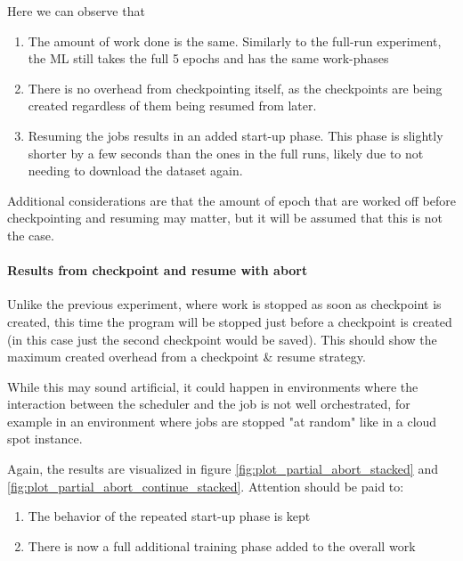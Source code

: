 Here we can observe that

\begin{enumerate}
    \item The amount of work done is the same. 
    Similarly to the full-run experiment, the ML still takes the full 5 epochs and has the same work-phases
    \item There is no overhead from checkpointing itself, as the checkpoints are being created regardless of them being resumed from later.
    \item Resuming the jobs results in an added start-up phase. This phase is slightly shorter by a few seconds than the ones in the full runs, likely due to not needing to download the dataset again.
\end{enumerate}

Additional considerations are that the amount of epoch that are worked off before checkpointing and resuming may matter, but it will be assumed that this is not the case.

\paragraph{Results from checkpoint and resume with abort}

Unlike the previous experiment, where work is stopped as soon as checkpoint is created, this time the program will be stopped just before a checkpoint is created (in this case just the second checkpoint would be saved). 
This should show the maximum created overhead from a checkpoint \& resume strategy. 

While this may sound artificial, it could happen in environments where the interaction between the scheduler and the job is not well orchestrated, for example in an environment where jobs are stopped "at random" like in a cloud spot instance.

Again, the results are visualized in figure \ref{fig:plot_partial_abort_stacked} and \ref{fig:plot_partial_abort_continue_stacked}. Attention should be paid to:

\begin{enumerate}
    \item The behavior of the repeated start-up phase is kept
    \item There is now a full additional training phase added to the overall work
\end{enumerate}

